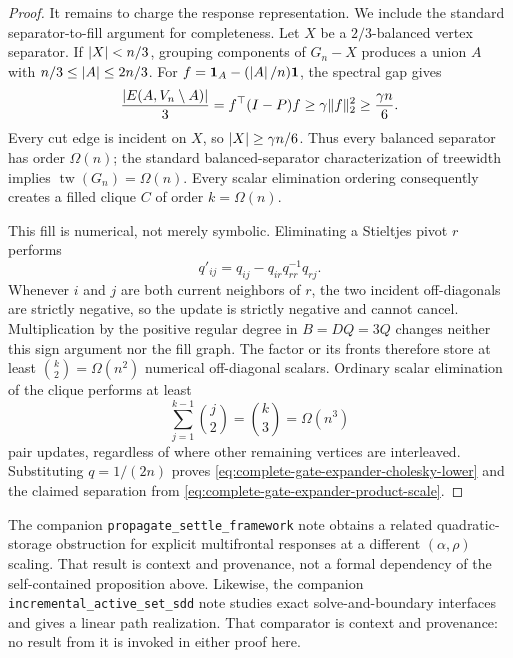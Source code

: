 \begin{proof}
It remains to charge the response representation.  We include the standard
separator-to-fill argument for completeness.  Let $X$ be a $2/3$-balanced
vertex separator.  If $\left\lvert X \right\rvert<n/3$, grouping components of $G_n-X$ produces
a union $A$ with $n/3\leq\left\lvert A \right\rvert\leq2n/3$.  For
$f=\mathbf1_A-(\left\lvert A \right\rvert/n)\mathbf{1}$, the spectral gap gives
\begin{equation}
 \frac{\left\lvert E(A,V_n\setminus A) \right\rvert}{3}
 =f^\top(I-P)f
 \geq\gamma\lVert f\rVert_2^2
 \geq\frac{\gamma n}{6}.
 \label{eq:complete-gate-expander-balanced-cut}
\end{equation}
Every cut edge is incident on $X$, so $\left\lvert X \right\rvert\geq\gamma n/6$.  Thus every
balanced separator has order $\Omega(n)$; the standard balanced-separator
characterization of treewidth implies $\operatorname{tw}(G_n)=\Omega(n)$.
Every scalar elimination ordering consequently creates a filled clique
$C$ of order $k=\Omega(n)$.

This fill is numerical, not merely symbolic.  Eliminating a Stieltjes pivot
$r$ performs
\begin{equation}
 q'_{ij}=q_{ij}-q_{ir}q_{rr}^{-1}q_{rj}.
 \label{eq:complete-gate-expander-strict-fill}
\end{equation}
Whenever $i$ and $j$ are both current neighbors of $r$, the two incident
off-diagonals are strictly negative, so the update is strictly negative and
cannot cancel.  Multiplication by the positive regular degree in
$B=DQ=3Q$ changes neither this sign argument nor the fill graph.  The factor
or its fronts therefore store at least $\binom{k}{2}=\Omega(n^2)$ numerical
off-diagonal scalars.  Ordinary scalar elimination of the clique performs at
least
\begin{equation*}
 \sum_{j=1}^{k-1}\binom j2=\binom k3=\Omega(n^3)
\end{equation*}
pair updates, regardless of where other remaining vertices are interleaved.
Substituting $q=1/(2n)$ proves
\cref{eq:complete-gate-expander-cholesky-lower} and the claimed separation
from \cref{eq:complete-gate-expander-product-scale}.
\end{proof}

The companion \texttt{propagate\_settle\_framework} note obtains a related
quadratic-storage obstruction for explicit multifrontal responses at a
different $(\alpha,\rho)$ scaling.  That result is context and provenance,
not a formal dependency of the self-contained proposition above.
Likewise, the companion \texttt{incremental\_active\_set\_sdd} note studies
exact solve-and-boundary interfaces and gives a linear path realization.
That comparator is context and provenance: no result from it is invoked in
either proof here.
